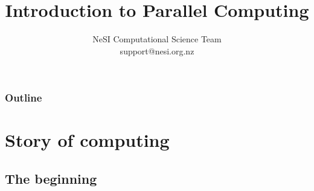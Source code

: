 \documentclass{beamer}
\title{Introduction to Parallel Computing}
\author{NeSI Computational Science Team \\support@nesi.org.nz}
\date{}
\newcommand\BackgroundPicture[1]{%
\setbeamertemplate{background}{%
\parbox[c][\paperheight]{\paperwidth}{%
\vfill \hfill \texttt{[image: \#1]}
\hfill \vfill
}}}
\begin{document}
{
\begin{frame}[plain]
\vspace{1cm}
\titlepage
\end{frame}
}


\begin{frame}
\frametitle{Outline}
\begin{multicols}{2}
   \tableofcontents
 \end{multicols}
 \end{frame}

\section{Story of computing}
\subsection{The beginning}
\end{document}
